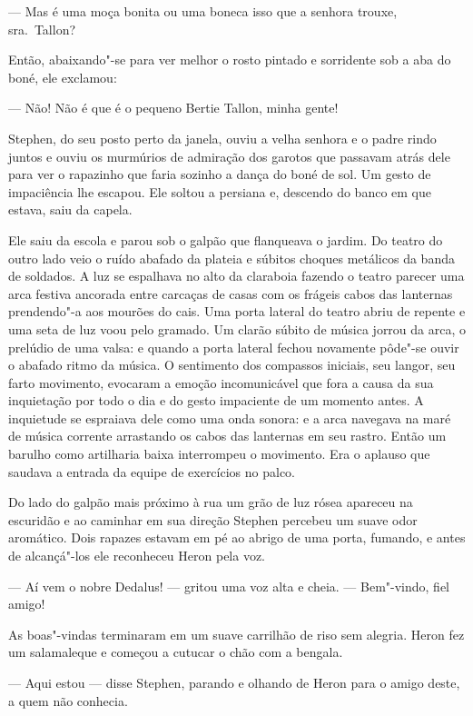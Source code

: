  --- Mas é uma moça bonita ou uma boneca isso que a senhora trouxe, sra.~Tallon?

Então, abaixando"-se para ver melhor o rosto pintado e sorridente sob a
aba do boné, ele exclamou:

 --- Não! Não é que é o pequeno Bertie Tallon, minha gente!

Stephen, do seu posto perto da janela, ouviu a velha senhora e o padre
rindo juntos e ouviu os murmúrios de admiração dos garotos que passavam
atrás dele para ver o rapazinho que faria sozinho a dança do boné de
sol. Um gesto de impaciência lhe escapou. Ele soltou a persiana e,
descendo do banco em que estava, saiu da capela.

Ele saiu da escola e parou sob o galpão que flanqueava o jardim. Do
teatro do outro lado veio o ruído abafado da plateia e súbitos choques
metálicos da banda de soldados. A luz se espalhava no alto da claraboia
fazendo o teatro parecer uma arca festiva ancorada entre carcaças
de casas com os frágeis cabos das lanternas prendendo"-a aos mourões do
cais. Uma porta lateral do teatro abriu de repente e uma seta de luz
voou pelo gramado. Um clarão súbito de música 				
jorrou da arca, o prelúdio de uma valsa: e quando a porta lateral fechou
novamente pôde"-se ouvir o abafado ritmo da música. O sentimento dos
compassos iniciais, seu langor, seu farto movimento, evocaram a emoção
incomunicável que fora a causa da sua inquietação por todo o dia e do
gesto impaciente de um momento antes. A inquietude se espraiava dele
como uma onda sonora: e a arca navegava na maré de música corrente
arrastando os cabos das lanternas em seu rastro. Então um barulho como
artilharia baixa interrompeu o movimento. Era o aplauso que saudava a
entrada da equipe de exercícios no palco.

Do lado do galpão mais próximo à rua um grão de luz rósea apareceu na
escuridão e ao caminhar em sua direção Stephen percebeu um suave odor
aromático. Dois rapazes estavam em pé ao abrigo de uma porta, fumando,
e antes de alcançá"-los ele reconheceu Heron pela voz.

 --- Aí vem o nobre Dedalus! --- gritou uma voz alta e cheia. --- Bem"-vindo, fiel
amigo!

As boas"-vindas terminaram em um suave carrilhão de riso sem alegria.
Heron fez um salamaleque e começou a cutucar o chão com a bengala.

 --- Aqui estou --- disse Stephen, parando e olhando de Heron para o amigo
deste, a quem não conhecia.

